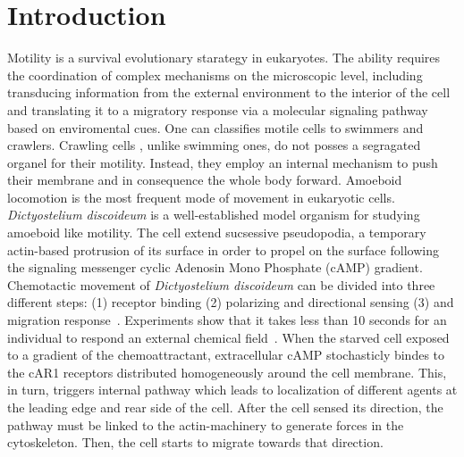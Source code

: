 \documentclass[10pt,letterpaper]{article}
\begin{document}
\section*{Introduction}
Motility is a survival evolutionary starategy  in eukaryotes\cite{Brunet-2016}. The ability requires the coordination of complex mechanisms on the microscopic level, including  transducing information from the external environment to the interior of the cell and translating it to a migratory response via a molecular signaling pathway based on enviromental cues. One can classifies motile cells to swimmers and crawlers. Crawling cells , unlike swimming ones, do not posses a segragated organel for their motility. Instead, they employ an internal mechanism to push their membrane and in consequence the whole body forward. Amoeboid locomotion is the most frequent mode of movement in eukaryotic cells. \textit{Dictyostelium discoideum} is a well-established  model organism  for studying amoeboid like motility. The cell extend sucsessive pseudopodia, a temporary actin-based protrusion of its surface in order to propel on the surface following the signaling messenger cyclic Adenosin Mono Phosphate (cAMP) gradient. \\
Chemotactic movement of \textit{Dictyostelium discoideum} can be divided into three different steps: (1) receptor binding (2) polarizing and directional sensing (3) and migration response~\cite{Devreotes-2003}. Experiments show that it takes less than 10 seconds for an individual to respond an external chemical field~\cite{Meili-2015}.
When the starved cell exposed to a gradient of the chemoattractant, extracellular cAMP stochasticly bindes to the  cAR1 receptors distributed homogeneously around the cell membrane. This, in turn, triggers internal pathway which leads to localization of different agents at the leading edge and rear side of the cell.  After the cell  sensed its direction, the pathway must be linked to the actin-machinery to generate forces in the cytoskeleton. Then, the cell starts to migrate towards that direction. %
 \\~
\end{document}
